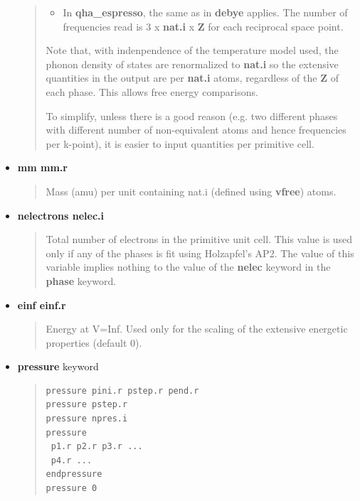 \documentclass[a4paper]{article}
\begin{document}
\begin{itemize}
\begin{quote}
\begin{itemize}
\item In \textbf{qha\_espresso}, the same as in \textbf{debye} applies. The number
of frequencies read is 3 x \textbf{nat.i} x \textbf{Z} for each reciprocal
space point.

\end{itemize}

Note that, with indenpendence of the temperature model used, the
phonon density of states are renormalized to \textbf{nat.i} so the
extensive quantities in the output are per \textbf{nat.i} atoms,
regardless of the \textbf{Z} of each phase. This allows free energy
comparisons.

To simplify, unless there is a good reason (e.g. two different
phases with different number of non-equivalent atoms and hence
frequencies per k-point), it is easier to input quantities per
primitive cell.

\end{quote}

\item \textbf{mm mm.r}
%
\begin{quote}

Mass (amu) per unit containing nat.i (defined using \textbf{vfree})
atoms.

\end{quote}

\item \textbf{nelectrons nelec.i}
%
\begin{quote}

Total number of electrons in the primitive unit cell. This value is
used only if any of the phases is fit using Holzapfel's AP2. The
value of this variable implies nothing to the value of the
\textbf{nelec} keyword in the \textbf{phase} keyword.

\end{quote}

\item \textbf{einf einf.r}
%
\begin{quote}

Energy at V=Inf. Used only for the scaling of the extensive
energetic properties (default 0).

\end{quote}

\item \textbf{pressure} keyword
%
\begin{quote}
%
\gibbslist
\begin{lstlisting}
pressure pini.r pstep.r pend.r
pressure pstep.r
pressure npres.i
pressure
 p1.r p2.r p3.r ...
 p4.r ...
endpressure
pressure 0
\end{lstlisting}


\end{quote}
\end{itemize}
\end{document}
